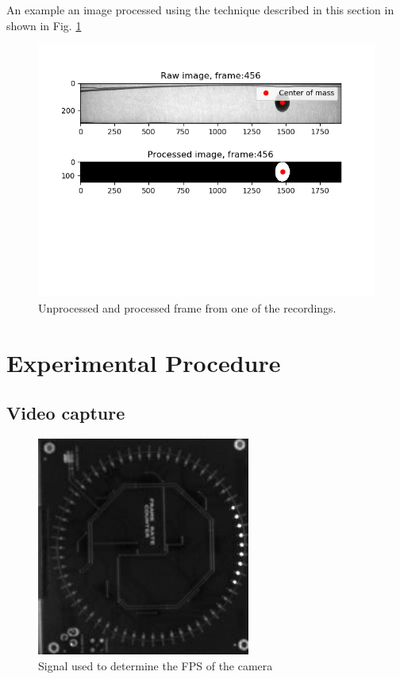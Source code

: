 \documentclass[11pt,a4paper]{article}
\begin{document}
      An example an image processed using the technique described in this section in shown in Fig. \ref{fig:vid_frame}

      \begin{figure}[H]
        \center
        \includegraphics[scale=0.75]{scripts/figs/graphs/B1_1.png}
        \caption{Unprocessed and processed frame from one of the recordings.}
        \label{fig:vid_frame}
      \end{figure}


\section{\label{section:experimental}Experimental Procedure} 
  
  \subsection{Video capture\label{subsect:vidcap}}
    
    \begin{figure}[H]
      \center
      \includegraphics[width=7cm]{scripts/figs/sync_fps.png}
      \caption{Signal used to determine the FPS of the camera}
      \label{fig:FpsSignal}
    \end{figure}
  
\end{document}
